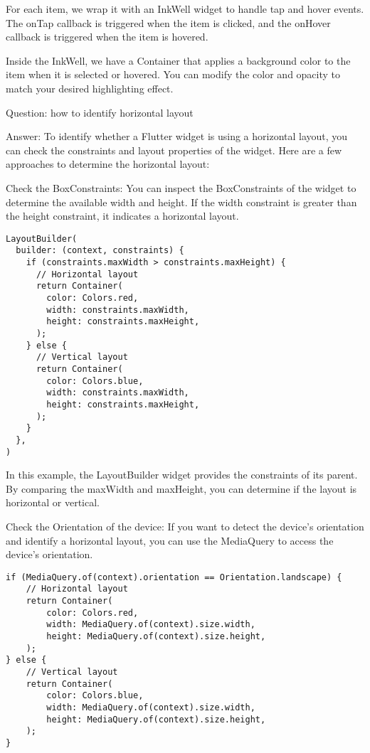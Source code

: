 For each item, we wrap it with an InkWell widget to handle tap and hover events. The onTap callback is triggered 
when the item is clicked, and the onHover callback is triggered when the item is hovered.

Inside the InkWell, we have a Container that applies a background color to the item when it is selected or hovered. 
You can modify the color and opacity to match your desired highlighting effect.


Question: how to identify horizontal layout

Answer: To identify whether a Flutter widget is using a horizontal layout, you can check the constraints and layout 
properties of the widget. Here are a few approaches to determine the horizontal layout:

Check the BoxConstraints: You can inspect the BoxConstraints of the widget to determine the available width and 
height. If the width constraint is greater than the height constraint, it indicates a horizontal layout.

\begin{lstlisting}
LayoutBuilder(
  builder: (context, constraints) {
    if (constraints.maxWidth > constraints.maxHeight) {
      // Horizontal layout
      return Container(
        color: Colors.red,
        width: constraints.maxWidth,
        height: constraints.maxHeight,
      );
    } else {
      // Vertical layout
      return Container(
        color: Colors.blue,
        width: constraints.maxWidth,
        height: constraints.maxHeight,
      );
    }
  },
)
\end{lstlisting}

In this example, the LayoutBuilder widget provides the constraints of its parent. By comparing the maxWidth and 
maxHeight, you can determine if the layout is horizontal or vertical.

Check the Orientation of the device: If you want to detect the device's orientation and identify a horizontal 
layout, you can use the MediaQuery to access the device's orientation. 

\begin{lstlisting}
if (MediaQuery.of(context).orientation == Orientation.landscape) {
    // Horizontal layout
    return Container(
        color: Colors.red,
        width: MediaQuery.of(context).size.width,
        height: MediaQuery.of(context).size.height,
    );
} else {
    // Vertical layout
    return Container(
        color: Colors.blue,
        width: MediaQuery.of(context).size.width,
        height: MediaQuery.of(context).size.height,
    );
}
\end{lstlisting}

